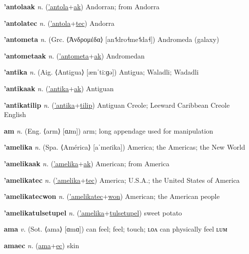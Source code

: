 \textbf{\hypertarget{'antolaak}{'antolaak}} \textit{n.} (\hyperlink{'antola}{'antola}+\allowbreak \hyperlink{ak}{ak})
Andorran; from Andorra

\textbf{\hypertarget{'antolatec}{'antolatec}} \textit{n.} (\hyperlink{'antola}{'antola}+\allowbreak \hyperlink{tec}{tec})
Andorra

\textbf{\hypertarget{'antometa}{'antometa}} \textit{n.} (Grc. ⟨Ἀνδρομέδα⟩ [an˦dro˧me˦da˧])
Andromeda (galaxy)

\textbf{\hypertarget{'antometaak}{'antometaak}} \textit{n.} (\hyperlink{'antometa}{'antometa}+\allowbreak \hyperlink{ak}{ak})
Andromedan

\textbf{\hypertarget{'antika}{'antika}} \textit{n.} (Aig. ⟨Antigua⟩ [ænˈtiːɡə])
Antigua; Waladli; Wadadli

\textbf{\hypertarget{'antikaak}{'antikaak}} \textit{n.} (\hyperlink{'antika}{'antika}+\allowbreak \hyperlink{ak}{ak})
Antiguan

\textbf{\hypertarget{'antikatilip}{'antikatilip}} \textit{n.} (\hyperlink{'antika}{'antika}+\allowbreak \hyperlink{tilip}{tilip})
Antiguan Creole; Leeward Caribbean Creole English

\textbf{\hypertarget{am}{am}} \textit{n.} (Eng. ⟨arm⟩ [ɑɹm])
arm; long appendage used for manipulation

\textbf{\hypertarget{'amelika}{'amelika}} \textit{n.} (Spa. ⟨América⟩ [aˈmeɾika])
America; the Americas; the New World

\textbf{\hypertarget{'amelikaak}{'amelikaak}} \textit{n.} (\hyperlink{'amelika}{'amelika}+\allowbreak \hyperlink{ak}{ak})
American; from America

\textbf{\hypertarget{'amelikatec}{'amelikatec}} \textit{n.} (\hyperlink{'amelika}{'amelika}+\allowbreak \hyperlink{tec}{tec})
America; U.S.A.; the United States of America

\textbf{\hypertarget{'amelikatecwon}{'amelikatecwon}} \textit{n.} (\hyperlink{'amelikatec}{'amelikatec}+\allowbreak \hyperlink{won}{won})
American; the American people

\textbf{\hypertarget{'amelikatulsetupel}{'amelikatulsetupel}} \textit{n.} (\hyperlink{'amelika}{'amelika}+\allowbreak \hyperlink{tulsetupel}{tulsetupel})
sweet potato

\textbf{\hypertarget{ama}{ama}} \textit{v.} (Sot. ⟨ama⟩ [ɑmɑ])
can feel; feel; touch; ʟᴏᴧ can physically feel ʟᴜᴍ

\textbf{\hypertarget{amaec}{amaec}} \textit{n.} (\hyperlink{ama}{ama}+\allowbreak \hyperlink{ec}{ec})
skin

